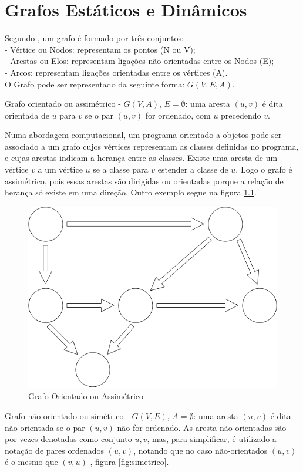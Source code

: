 \chapter{Grafos Estáticos e Dinâmicos} \label{grafoestdin}
Segundo \cite{negreirosbook}, um grafo é formado por três conjuntos:\\
- Vértice ou Nodos: representam os pontos (N ou V);\\
- Arestas ou Elos: representam ligações não orientadas entre os Nodos (E);\\
- Arcos: representam ligações orientadas entre os vértices (A).\\
O Grafo pode ser representado da seguinte forma: $G(V, E, A)$.

Grafo orientado ou assimétrico - $G(V, A)$, $E = \emptyset$: uma aresta $(u,v)$ é dita orientada de $u$
para $v$ se o par $(u,v)$ for ordenado, com $u$ precedendo $v$.

Numa abordagem computacional, um programa orientado a objetos pode ser associado a um grafo cujos vértices
representam as classes definidas no programa, e cujas arestas indicam a herança entre as classes.
Existe uma aresta de um vértice $v$ a um vértice $u$ se a classe para $v$ estender a classe de $u$.
Logo o grafo é assimétrico, pois essas arestas são dirigidas ou orientadas porque a relação de herança
só existe em uma direção. Outro exemplo segue na figura \ref{fig:assimetrico}.

\begin{figure}[htbp]
\centering
 \includegraphics[width=.55\textwidth]{chapters/fig/assimetrico1.png}
\caption{Grafo Orientado ou Assimétrico}
\label{fig:assimetrico}
\end{figure}

Grafo não orientado ou simétrico - $G(V, E)$, $A = \emptyset$: uma aresta $(u,v)$ é dita não-orientada
se o par $(u,v)$ não for ordenado. As aresta não-orientadas são por vezes denotadas como conjunto ${u,v}$,
mas, para simplificar, é utilizado a notação de pares ordenados $(u,v)$, notando que no caso não-orientados
$(u,v)$ é o mesmo que $(v,u)$ \cite{goodrich}, figura \ref{fig:simetrico}.

